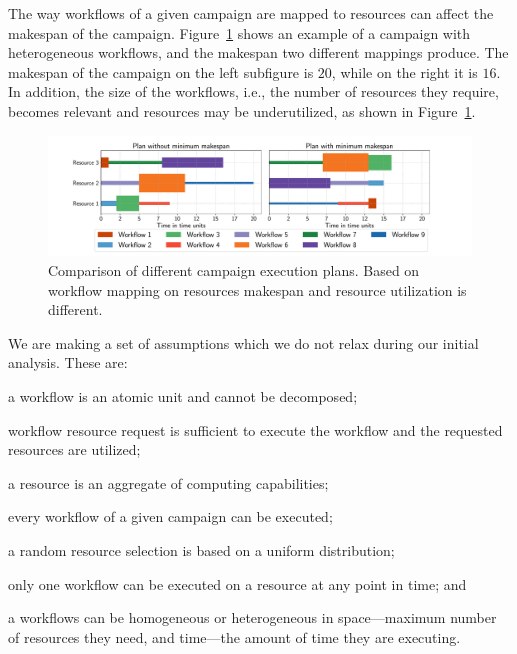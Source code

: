 The way workflows of a given campaign are mapped to resources can affect the makespan of the campaign. 
Figure~\ref{fig:example_makespan} shows an example of a campaign with heterogeneous workflows, and the makespan two different mappings produce.
The makespan of the campaign on the left subfigure is $20$, while on the right it is $16$.
In addition, the size of the workflows, i.e., the number of resources they require, becomes relevant and resources may be underutilized, as shown in Figure~\ref{fig:example_makespan}.

\begin{figure}[ht!]
    \centering
    \includegraphics[width=.95\textwidth]{figures/random_vs_specific.pdf}
    \caption{Comparison of different campaign execution plans. Based on workflow mapping on resources makespan and resource utilization is different.}\label{fig:example_makespan}
\end{figure}

We are making a set of assumptions which we do not relax during our initial analysis.
These are:
\begin{inparaenum}[(1)]
    \item a workflow is an atomic unit and cannot be decomposed;
    \item workflow resource request is sufficient to execute the workflow and the requested resources are utilized;
    \item a resource is an aggregate of computing capabilities;
    \item every workflow of a given campaign can be executed;
    \item a random resource selection is based on a uniform distribution;
    \item only one workflow can be executed on a resource at any point in time; and
    \item a workflows can be homogeneous or heterogeneous in space---maximum number of resources they need, and time---the amount of time they are executing.
\end{inparaenum}

